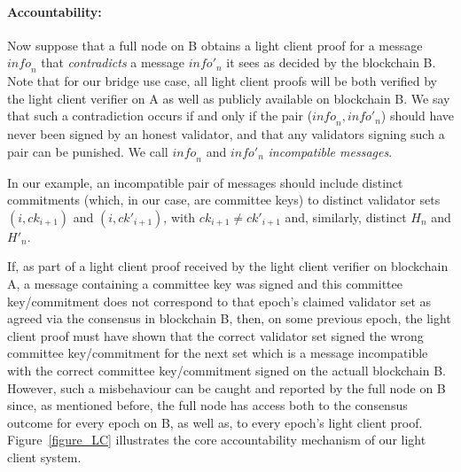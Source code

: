 \noindent\paragraph{Accountability:} Now suppose that a full node on B obtains a light client proof for a message 
$\mathit{info}_n$ that \emph{contradicts} a message $\mathit{info}'_n$ it sees as decided by the blockchain B. Note that for our bridge 
use case, all light client proofs will be both verified by the light client verifier on A as well as publicly available on blockchain B. 
We say that such a contradiction occurs if and only if the pair ($\mathit{info}_n, \mathit{info}'_n$) should have never been  
signed by an honest validator, and that any validators signing such a pair can be punished. We call $\mathit{info}_n$ and 
$\mathit{info}'_n$ \emph{incompatible messages}. 

In our example, an incompatible pair of messages should include 
distinct commitments (which, in our case, are committee keys) to distinct validator sets 
$(i,\mathit{ck}_{i+1})$ and $(i,\mathit{ck}'_{i+1})$, with $\mathit{ck}_{i+1} \neq \mathit{ck}'_{i+1}$ and, similarly,  
distinct $H_n$ and $H'_n$. 


If, as part of a light client proof received by the light client verifier on blockchain A, a message containing a committee 
key was signed and this committee key/commitment does not correspond to that epoch's claimed validator set as agreed 
via the consensus in blockchain B, then, on some previous epoch, the light client proof must have shown that the correct 
validator set signed the wrong committee key/commitment for the next set which is a message incompatible with the 
correct committee key/commitment signed on the actuall blockchain B. However, such a misbehaviour can be caught and 
reported by the full node on B since, as mentioned before, the full node has access both to the consensus outcome for 
every epoch on B, as well as, to every epoch's light client proof. Figure~\ref{figure_LC} illustrates the core accountability mechanism of our light client system. \\

